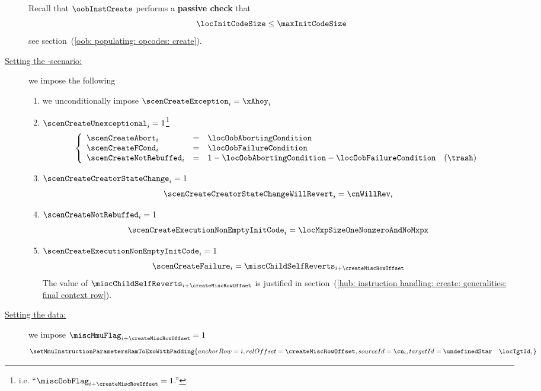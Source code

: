 \begin{description}
		\saNote{}
		Recall that $\oobInstCreate$ performs a \textbf{passive check} that
		\[
			\locInitCodeSize \leq \maxInitCodeSize
		\]
		see section~(\ref{oob: populating: opcodes: create}).
	\item[\underline{Setting the \inst{CREATE}-scenario:}]
		\label{hub: instruction handling: create: generalities: refining the CREATE scenario}
		we impose the following
		\begin{enumerate}
			\item we unconditionally impose $\scenCreateException_{i} = \xAhoy_{i}$ \label{create: setting exceptional scenario}
			\item \If $\scenCreateUnexceptional_{i} = 1$\footnote{i.e. ``\If $\miscOobFlag_{i + \createMiscRowOffset} = 1$.''} \Then
				\[
					\left\{ \begin{array}{lclr}
						\scenCreateAbort       _{i} & = & \locOobAbortingCondition                               \\
						\scenCreateFCond       _{i} & = & \locOobFailureCondition                                \\
						\scenCreateNotRebuffed _{i} & = & 1 - \locOobAbortingCondition - \locOobFailureCondition  & (\trash) \\
					\end{array} \right.
				\]
			\item \If $\scenCreateCreatorStateChange_{i} = 1$ \Then
				\[
					\scenCreateCreatorStateChangeWillRevert_{i}
					=
					\cnWillRev_{i}
				\]
			\item \If $\scenCreateNotRebuffed _{i} = 1$ \Then
				\[
					\scenCreateExecutionNonEmptyInitCode _{i}
					=
					\locMxpSizeOneNonzeroAndNoMxpx
				\]
			\item \If $\scenCreateExecutionNonEmptyInitCode _{i} = 1$ \Then
				\[
					\scenCreateFailure _{i}
					=
					\miscChildSelfReverts _{i + \createMiscRowOffset}
				\]
				\saNote{}
				The value of $\miscChildSelfReverts _{i + \createMiscRowOffset}$ is justified in section~(\ref{hub: instruction handling: create: generalities: final context row}).
		\end{enumerate}
	\item[\underline{Setting the \mmuMod{} data:}]
		we impose \If $\miscMmuFlag_{i + \createMiscRowOffset} = 1$ \Then
		\[
			\setMmuInstructionParametersRamToExoWithPadding {
				anchorRow         = i                               ,
				relOffset         = \createMiscRowOffset            ,
				sourceId          = \cn_{i}                         ,
				targetId          = \undefinedStar \quad \locTgtId  ,
}\]
\end{description}
